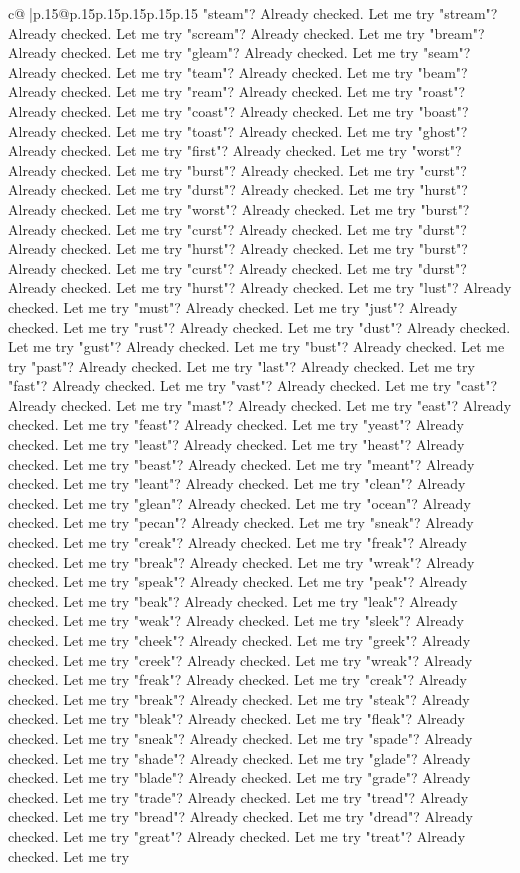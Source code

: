 \documentclass{article}
\begin{document}
{\begin{supertabular}{c@{$\;$}|p{.15\linewidth}@{}p{.15\linewidth}p{.15\linewidth}p{.15\linewidth}p{.15\linewidth}p{.15\linewidth}}
{{{"steam"? Already checked. Let me try "stream"? Already checked. Let me try "scream"? Already checked. Let me try "bream"? Already checked. Let me try "gleam"? Already checked. Let me try "seam"? Already checked. Let me try "team"? Already checked. Let me try "beam"? Already checked. Let me try "ream"? Already checked. Let me try "roast"? Already checked. Let me try "coast"? Already checked. Let me try "boast"? Already checked. Let me try "toast"? Already checked. Let me try "ghost"? Already checked. Let me try "first"? Already checked. Let me try "worst"? Already checked. Let me try "burst"? Already checked. Let me try "curst"? Already checked. Let me try "durst"? Already checked. Let me try "hurst"? Already checked. Let me try "worst"? Already checked. Let me try "burst"? Already checked. Let me try "curst"? Already checked. Let me try "durst"? Already checked. Let me try "hurst"? Already checked. Let me try "burst"? Already checked. Let me try "curst"? Already checked. Let me try "durst"? Already checked. Let me try "hurst"? Already checked. Let me try "lust"? Already checked. Let me try "must"? Already checked. Let me try "just"? Already checked. Let me try "rust"? Already checked. Let me try "dust"? Already checked. Let me try "gust"? Already checked. Let me try "bust"? Already checked. Let me try "past"? Already checked. Let me try "last"? Already checked. Let me try "fast"? Already checked. Let me try "vast"? Already checked. Let me try "cast"? Already checked. Let me try "mast"? Already checked. Let me try "east"? Already checked. Let me try "feast"? Already checked. Let me try "yeast"? Already checked. Let me try "least"? Already checked. Let me try "heast"? Already checked. Let me try "beast"? Already checked. Let me try "meant"? Already checked. Let me try "leant"? Already checked. Let me try "clean"? Already checked. Let me try "glean"? Already checked. Let me try "ocean"? Already checked. Let me try "pecan"? Already checked. Let me try "sneak"? Already checked. Let me try "creak"? Already checked. Let me try "freak"? Already checked. Let me try "break"? Already checked. Let me try "wreak"? Already checked. Let me try "speak"? Already checked. Let me try "peak"? Already checked. Let me try "beak"? Already checked. Let me try "leak"? Already checked. Let me try "weak"? Already checked. Let me try "sleek"? Already checked. Let me try "cheek"? Already checked. Let me try "greek"? Already checked. Let me try "creek"? Already checked. Let me try "wreak"? Already checked. Let me try "freak"? Already checked. Let me try "creak"? Already checked. Let me try "break"? Already checked. Let me try "steak"? Already checked. Let me try "bleak"? Already checked. Let me try "fleak"? Already checked. Let me try "sneak"? Already checked. Let me try "spade"? Already checked. Let me try "shade"? Already checked. Let me try "glade"? Already checked. Let me try "blade"? Already checked. Let me try "grade"? Already checked. Let me try "trade"? Already checked. Let me try "tread"? Already checked. Let me try "bread"? Already checked. Let me try "dread"? Already checked. Let me try "great"? Already checked. Let me try "treat"? Already checked. Let me try }}}
\end{supertabular}}
\end{document}
